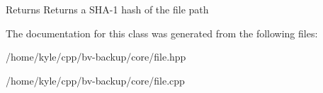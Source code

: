 \begin{DoxyReturn}{Returns}
Returns a S\+H\+A-\/1 hash of the file path 
\end{DoxyReturn}


The documentation for this class was generated from the following files\+:\begin{DoxyCompactItemize}
\item 
/home/kyle/cpp/bv-\/backup/core/file.\+hpp\item 
/home/kyle/cpp/bv-\/backup/core/file.\+cpp\end{DoxyCompactItemize}
